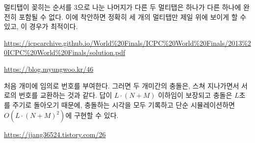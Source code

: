 \begin{hint}
    멀티탭이 꽂히는 순서를 $3$으로 나눈 나머지가 다른 두 멀티탭은 하나가 다른 하나에 완전히 포함될 수 없다. 이에 착안하면 정확히 세 개의 멀티탭만 제일 위에 보이게 할 수 있고, 이 경우가 최적이다.
\end{hint}

\begin{hint}
    \url{https://icpcarchive.github.io/World%20Finals/ICPC%20World%20Finals/2013%20ICPC%20World%20Finals/solution.pdf}
\end{hint}

\begin{hint}
    \url{https://blog.myungwoo.kr/46}
\end{hint}

\begin{hint}
    처음 개미에 임의로 번호를 부여한다. 그러면 두 개미간의 충돌은, 스쳐 지나가면서 서로의 번호를 교환하는 것과 같다. 답이 $L \cdot (N+M)$ 이하임이 보장되고 충돌은 $L$초를 주기로 돌아오기 때문에, 충돌하는 시각을 모두 기록하고 단순 시뮬레이션하면 $O(L \cdot (N+M)^2)$에 구현할 수 있다.
\end{hint}

\begin{hint}
    \url{https://jjang36524.tistory.com/26}
\end{hint}

